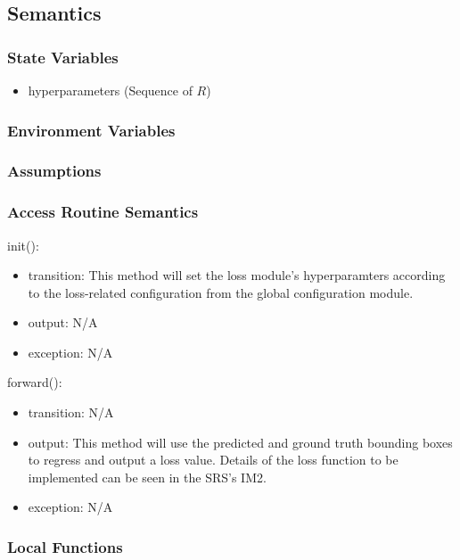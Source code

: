 \documentclass[12pt, titlepage]{article}
\begin{document}
\subsection{Semantics}

\subsubsection{State Variables}

\begin{itemize}
  \item hyperparameters (Sequence of $R$)
\end{itemize}

\subsubsection{Environment Variables}

\subsubsection{Assumptions}

\subsubsection{Access Routine Semantics}
\noindent init():
\begin{itemize}
\item transition: This method will set the loss module's hyperparamters according to the loss-related configuration from the global configuration module. 
\item output: N/A
\item exception: N/A
\end{itemize}

\noindent forward():
\begin{itemize}
\item transition: N/A 
\item output: This method will use the predicted and ground truth bounding boxes to regress and output a loss value. Details of the loss function to be implemented can be seen in the SRS's IM2.
\item exception: N/A
\end{itemize}

\subsubsection{Local Functions}
\end{document}
